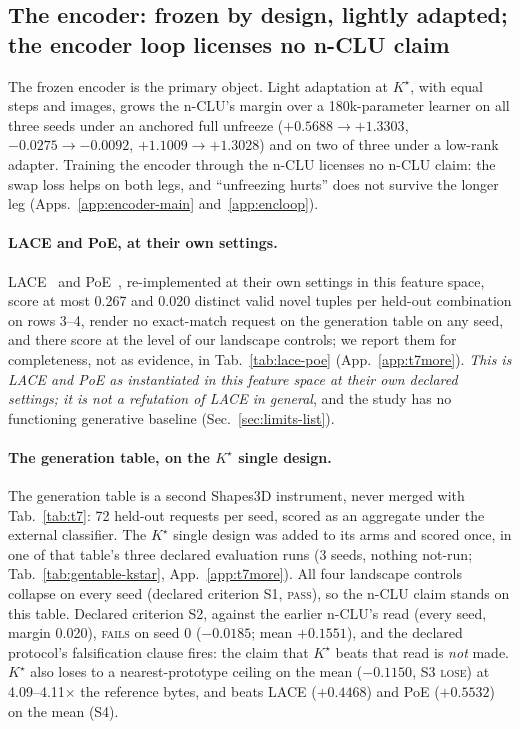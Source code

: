 \documentclass{article} %
\newcommand{\Kstar}{\ensuremath{K^{\star}}}
\begin{document}
\subsection{The encoder: frozen by design, lightly adapted; the encoder loop licenses no n-CLU claim}
\label{sec:adapt}\label{sec:bard}
The frozen encoder is the primary object. Light adaptation at $\Kstar$, with equal steps and
images, grows the n-CLU's margin over a 180k-parameter learner on all three seeds under an
anchored full unfreeze ($+0.5688\to+1.3303$, $-0.0275\to-0.0092$, $+1.1009\to+1.3028$) and on two
of three under a low-rank adapter. %
Training the encoder through the n-CLU licenses no n-CLU claim: the swap loss helps on both legs,
and ``unfreezing hurts'' does not survive the longer leg (Apps.~\ref{app:encoder-main}
and~\ref{app:encloop}).

\paragraph{LACE and PoE, at their own settings.}
LACE~\citep{nie2021controllable} and PoE~\citep{hinton2002training}, re-implemented at their own
settings in this feature space, score at most 0.267 and 0.020 distinct valid novel tuples per held-out combination %
on rows 3--4, render no exact-match request on the generation table on any seed, and there score at
the level of our landscape controls; we report them for completeness, not as evidence, in
Tab.~\ref{tab:lace-poe} (App.~\ref{app:t7more}). \emph{This is LACE and PoE as instantiated in
this feature space at their own declared settings; it is not a refutation of LACE in general}, and
the study has no functioning generative baseline (Sec.~\ref{sec:limits-list}).

\paragraph{The generation table, on the $\Kstar$ single design.}
The generation table is a second Shapes3D instrument, never merged with Tab.~\ref{tab:t7}: 72 %
held-out requests per seed, scored as an aggregate under the external classifier. The $\Kstar$ single design was added
to its arms and scored once, in one of that table's three declared evaluation runs (3 seeds,
nothing not-run; Tab.~\ref{tab:gentable-kstar}, %
App.~\ref{app:t7more}). All four landscape controls collapse on every seed (declared criterion S1, %
\textsc{pass}), so the n-CLU claim stands on this table. Declared criterion S2, against the earlier
n-CLU's read (every seed, margin 0.020), \textsc{fails} on seed 0 ($-0.0185$; mean $+0.1551$), and the %
declared protocol's falsification clause fires: the claim that $\Kstar$ beats that read is
\emph{not} made. $\Kstar$ also loses to a nearest-prototype ceiling on the mean %
($-0.1150$, S3 \textsc{lose}) at 4.09--4.11$\times$ the reference bytes, and beats LACE %
($+0.4468$) and PoE ($+0.5532$) on the mean (S4). %
\end{document}
